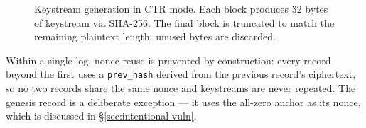 \documentclass[a4paper, 12pt]{article}
\begin{document}
\begin{figure}[H]
        \caption{Keystream generation in CTR mode. Each block produces 32 bytes of keystream via SHA-256. The final block is truncated to match the remaining plaintext length; unused bytes are discarded.}
    \end{figure}
    Within a single log, nonce reuse is prevented by construction: every record beyond the first uses a \texttt{prev\_hash} derived from the previous record's ciphertext, so no two records share the same nonce and keystreams are never repeated. The genesis record is a deliberate exception --- it uses the all-zero anchor as its nonce, which is discussed in \S\ref{sec:intentional-vuln}.
\end{document}
